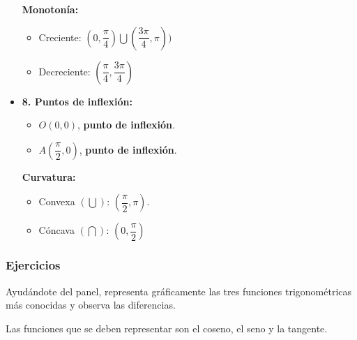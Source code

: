 \begin{itemize}
\begin{itemize}
	\end{itemize}
	\textbf{Monotonía: }\\
	\begin{itemize}
		\item Creciente: $(0, \dfrac{\pi}{4}) \bigcup (\dfrac{3\pi}{4}, \pi))$
		\item Decreciente: $(\dfrac{\pi}{4}, \dfrac{3\pi}{4})$
	\end{itemize}
	\item \textbf{8. Puntos de inflexión:}\\
	\begin{itemize}
		\item $O(0,0)$, \textbf{punto de inflexión}.
		\item $A(\dfrac{\pi}{2},0)$, \textbf{punto de inflexión}.
	\end{itemize}
	\textbf{Curvatura: }\\
	\begin{itemize}
		\item Convexa $(\bigcup)$: $(\dfrac{\pi}{2}, \pi)$.
		\item Cóncava $(\bigcap)$: $(0, \dfrac{\pi}{2})$
	\end{itemize}
\end{itemize}
\subsubsection{Ejercicios}
\begin{ex}
	Ayudándote del panel, representa gráficamente las tres funciones trigonométricas más conocidas y observa las diferencias.
	\begin{sol}
		Las funciones que se deben representar son el coseno, el seno y la tangente.
	\end{sol}
\end{ex}
